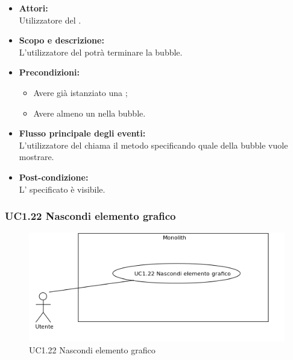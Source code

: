 \begin{itemize}
	\item \textbf{Attori:}
	\\Utilizzatore del .
	\item \textbf{Scopo e descrizione:} 
	\\L’utilizzatore del  potrà terminare la bubble.
	\item \textbf{Precondizioni:}
	\begin{itemize}
		\item Avere già istanziato una ;
		\item Avere almeno un  nella bubble.
	\end{itemize}
	\item \textbf{Flusso principale degli eventi:}
	\\L’utilizzatore del  chiama il metodo specificando quale  della bubble vuole mostrare.
	\item \textbf{Post-condizione:}
	\\L' specificato è visibile.
\end{itemize}

\subsubsection{UC1.22 Nascondi elemento grafico} \label{UC1.22}

\begin{figure}[H]
	\centering
	\includegraphics[width=15cm]{../../documenti/AnalisiDeiRequisiti/Diagrammi_img/uc1_22.png}
	\caption{UC1.22 Nascondi elemento grafico}
\end{figure}

